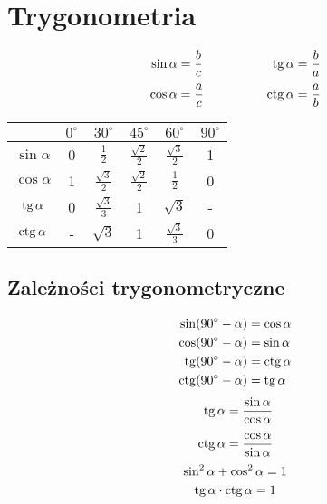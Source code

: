 \chapter{Trygonometria}
\begin{center}
\end{center}
\begin{equation}
  \begin{aligned}
    \sin\alpha &= \frac bc \qquad\qquad&\operatorname{tg}\alpha &= \frac ba\\[2pt]
    \cos\alpha &= \frac ac \qquad\qquad&\operatorname{ctg}\alpha &= \frac ab
  \end{aligned}
\end{equation}
\vspace{20pt}
\begin{center}
  \begin{tabular}{|*6{c|}}
    \hline
    & $0^\circ$ & $30^\circ$ & $45^\circ$ & $60^\circ$ & $90^\circ$\\
    \hline
    $\sin\alpha$ & 0 & $\frac 12$ & $\frac{\sqrt2}{2}$ & $\frac{\sqrt3}{2}$ & 1\\
    \hline
    $\cos\alpha$ & 1 & $\frac{\sqrt3}{2}$ & $\frac{\sqrt2}{2}$ & $\frac 12$ & 0\\
    \hline
    $\operatorname{tg}\alpha$ & 0 & $\frac{\sqrt3}{3}$ & 1 & $\sqrt3$ & -\\
    \hline
    $\operatorname{ctg}\alpha$ & - & $\sqrt3$ & 1 & $\frac{\sqrt3}{3}$ & 0\\
    \hline
  \end{tabular}
\end{center}
\section{Zależności trygonometryczne}
\begin{equation}
  \begin{aligned}
    \sin(90^\circ - \alpha) &= \cos\alpha\\
    \cos(90^\circ - \alpha) &= \sin\alpha\\
    \operatorname{tg}(90^\circ - \alpha) &= \operatorname{ctg}\alpha\\
    \operatorname{ctg}(90^\circ - \alpha) &= \operatorname{tg}\alpha
  \end{aligned}
\end{equation}
\begin{equation}
  \begin{aligned}
    \operatorname{tg}\alpha = \frac{\sin\alpha}{\cos\alpha}\\[4pt]
    \operatorname{ctg}\alpha = \frac{\cos\alpha}{\sin\alpha}
  \end{aligned}
\end{equation}
\begin{gather}
  \sin^2\alpha + \cos^2\alpha = 1\\
  \operatorname{tg}\alpha\cdot\operatorname{ctg}\alpha = 1
\end{gather}

